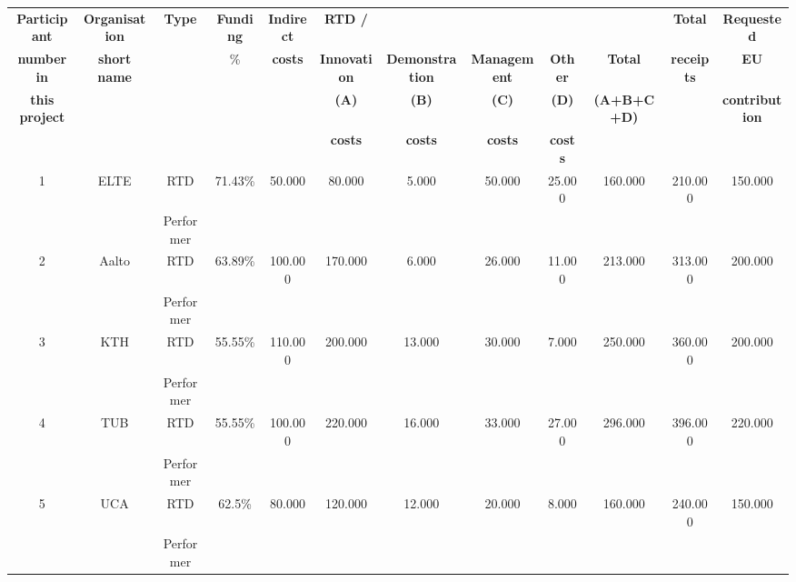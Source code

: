\begin{center}
	\begin{adjustbox}{width=1\textwidth}
		\begin{tabular}{ |c|c|c|c|c|c|c|c|c|c|c|c|} 
			\hline
			\textbf{Participant} & \textbf{Organisation} & \textbf{Type} & \textbf{Funding} & \textbf{Indirect} & \textbf{RTD /} & ~ & ~ & ~ & \textbf{~} & \textbf{Total} & \textbf{Requested}\\
			
			\textbf{number in} & \textbf{short name} & ~ & \% & \textbf{costs} & \textbf{Innovation} & \textbf{Demonstration} & \textbf{Management} & \textbf{Other} & \textbf{Total} & \textbf{receipts} & \textbf{EU} \\
			
			\textbf{this project} & ~ & ~ & ~ & ~ & \textbf{(A)} & \textbf{(B)} & \textbf{(C)} & \textbf{(D)} & \textbf{(A+B+C+D)} & ~ & \textbf{contribution} \\
			
			~ & ~ & ~ & ~ & ~ & \textbf{costs} & \textbf{costs} & \textbf{costs} & \textbf{costs} & ~ & ~ & ~ \\
			\hline
			
			1 & ELTE & RTD & 71.43\% & 50.000 & 80.000 & 5.000 & 50.000 & 25.000 & 160.000 & 210.000 & 150.000 \\
			~ & ~ & Performer & ~ & ~ & ~ & ~ & ~ & ~ & ~ & ~ & \\
			\hline
			
			2 & Aalto & RTD & 63.89\% & 100.000 & 170.000 & 6.000 & 26.000 & 11.000 & 213.000 & 313.000 & 200.000 \\
			~ & ~ & Performer & ~ & ~ & ~ & ~ & ~ & ~ & ~ & ~ & \\
			\hline
			
			3 & KTH & RTD & 55.55\% & 110.000 & 200.000 & 13.000 & 30.000 & 7.000 & 250.000 & 360.000 & 200.000 \\
			~ & ~ & Performer & ~ & ~ & ~ & ~ & ~ & ~ & ~ & ~ &\\
			\hline
			
			4 & TUB & RTD & 55.55\% & 100.000 & 220.000 & 16.000 & 33.000 & 27.000 & 296.000 & 396.000 & 220.000 \\
			~ & ~ & Performer & ~ & ~ & ~ & ~ & ~ & ~ & ~ & ~ & \\
			\hline
			
			5 & UCA & RTD & 62.5\% & 80.000 & 120.000 & 12.000 & 20.000 & 8.000 & 160.000 & 240.000 & 150.000 \\
			~ & ~ & Performer & ~ & ~ & ~ & ~ & ~ & ~ & ~ & ~ & \\
			\hline
			

\end{tabular}
\end{adjustbox}
\end{center}

